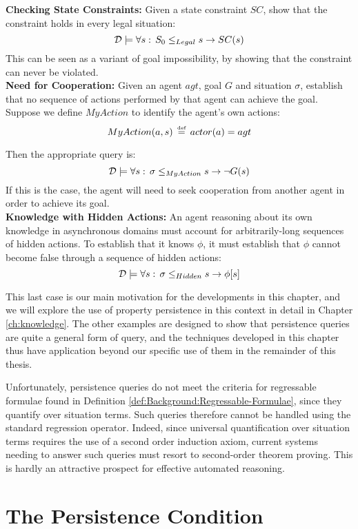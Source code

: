 \textbf{Checking State Constraints:} Given a state constraint $SC$,
show that the constraint holds in every legal situation:\[
\mathcal{D}\models\forall s:\, S_{0}\leq_{Legal}s\rightarrow SC(s)\]
 This can be seen as a variant of goal impossibility, by showing that
the constraint can never be violated.\\


\textbf{Need for Cooperation:} Given an agent $agt$, goal $G$ and
situation $\sigma$, establish that no sequence of actions performed
by that agent can achieve the goal. Suppose we define $MyAction$
to identify the agent's own actions:\[
MyAction(a,s)\,\stackrel{\mbox{\tiny def}}{=}\, actor(a)=agt\]


Then the appropriate query is:\[
\mathcal{D}\models\forall s:\,\sigma\leq_{MyAction}s\rightarrow\neg G(s)\]
 If this is the case, the agent will need to seek cooperation from
another agent in order to achieve its goal.\\


\textbf{Knowledge with Hidden Actions:} An agent reasoning about its
own knowledge in asynchronous domains must account for arbitrarily-long
sequences of hidden actions. To establish that it knows $\phi$, it
must establish that $\phi$ cannot become false through a sequence
of hidden actions:\[
\mathcal{D}\models\forall s:\,\sigma\leq_{Hidden}s\rightarrow\phi[s]\]


This last case is our main motivation for the developments in this
chapter, and we will explore the use of property persistence in this
context in detail in Chapter \ref{ch:knowledge}. The other examples
are designed to show that persistence queries are quite a general
form of query, and the techniques developed in this chapter thus have
application beyond our specific use of them in the remainder of this
thesis.

Unfortunately, persistence queries do not meet the criteria for regressable
formulae found in Definition \ref{def:Background:Regressable-Formulae},
since they quantify over situation terms. Such queries therefore cannot
be handled using the standard regression operator. Indeed, since universal
quantification over situation terms requires the use of a second order
induction axiom, current systems needing to answer such queries must
resort to second-order theorem proving. This is hardly an attractive
prospect for effective automated reasoning.


\section{The Persistence Condition\label{sec:Persistence:Condition}}

